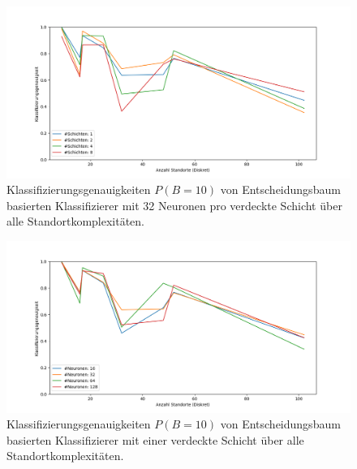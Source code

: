 \begin{figure}[h!]
    \centering
    \includegraphics[width=\linewidth]{images/multiple_best_by_group_knn_layers_acc_10_cont.png}
    \caption{Klassifizierungsgenauigkeiten $P(B=10)$ von Entscheidungsbaum basierten Klassifizierer mit 32 Neuronen pro verdeckte Schicht über alle Standortkomplexitäten.}
    \label{fig:multiple_best_by_group_knn_layers_acc_10_cont}
\end{figure}

\begin{figure}[h!]
    \centering
    \includegraphics[width=\linewidth]{images/multiple_best_by_group_knn_neurons_acc_10_cont.png}
    \caption{Klassifizierungsgenauigkeiten $P(B=10)$ von Entscheidungsbaum basierten Klassifizierer mit einer verdeckte Schicht über alle Standortkomplexitäten.}
    \label{fig:multiple_best_by_group_knn_layers_acc_10_cont}
\end{figure}